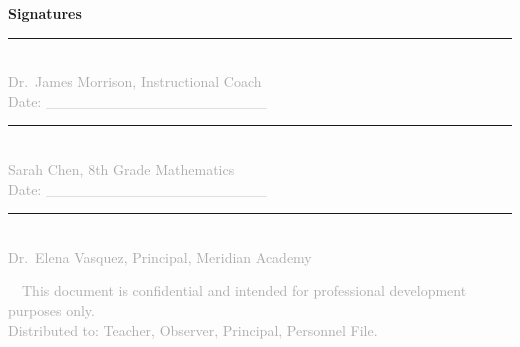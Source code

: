 \documentclass[11pt,a4paper]{article}
\begin{document}
\begin{tcolorbox}[colback=white,colframe=borderlight,boxrule=0.5pt,arc=3pt,left=14pt,right=14pt,top=14pt,bottom=14pt]
\noindent\textcolor{primary}{\textbf{Signatures}}

\vspace{20pt}

\noindent\begin{minipage}[t]{0.45\textwidth}
\noindent\rule{\linewidth}{0.4pt}\\[2pt]
{\footnotesize\textcolor{darkgray}{Dr.\ James Morrison, Instructional Coach}}\\[2pt]
{\footnotesize\textcolor{darkgray}{Date: \_\_\_\_\_\_\_\_\_\_\_\_\_\_\_\_\_\_\_\_\_}}
\end{minipage}%
\hfill
\begin{minipage}[t]{0.45\textwidth}
\noindent\rule{\linewidth}{0.4pt}\\[2pt]
{\footnotesize\textcolor{darkgray}{Sarah Chen, 8th Grade Mathematics}}\\[2pt]
{\footnotesize\textcolor{darkgray}{Date: \_\_\_\_\_\_\_\_\_\_\_\_\_\_\_\_\_\_\_\_\_}}
\end{minipage}

\vspace{12pt}

\noindent\begin{minipage}[t]{0.45\textwidth}
\noindent\rule{\linewidth}{0.4pt}\\[2pt]
{\footnotesize\textcolor{darkgray}{Dr.\ Elena Vasquez, Principal, Meridian Academy}}
\end{minipage}

\vspace{8pt}

\begin{center}
{\footnotesize\textcolor{darkgray}{\faLock\ \ This document is confidential and intended for professional development purposes only.\\Distributed to: Teacher, Observer, Principal, Personnel File.}}
\end{center}
\end{tcolorbox}

\label{LastPage}
\end{document}
